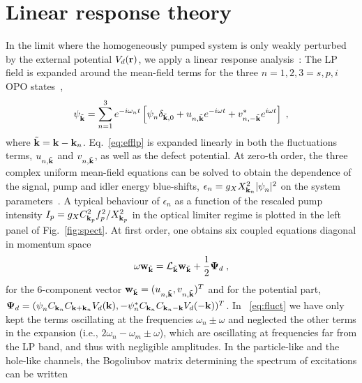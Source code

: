 \section{Linear response theory}
%
In the limit where the homogeneously pumped system is only weakly
perturbed by the external potential $V_d({\mathbf r})$, we apply a linear
response analysis~\cite{Astrakharchik_2004}: The LP field is expanded
around the mean-field terms for the three $n=1,2,3=s,p,i$ OPO
states~\cite{Whittaker_2005},
%
\begin{equation}
  \psi_{\tilde{{\mathbf k}}}^{} = \sum_{n=1}^3 e^{-i \omega_n t}
  \left[\psi_{n}^{} \delta_{\tilde{{\mathbf k}},0} +
    u_{n,\tilde{{\mathbf k}}}^{} e^{-i\omega t} +
    v^*_{n,-\tilde{{\mathbf k}}} e^{i\omega t} \right]\; ,
\label{eq:expan}
\end{equation}
%
where $\tilde{{\mathbf k}} = {\mathbf k} - {\mathbf k}_n$. Eq.~\eqref{eq:efflp}
is expanded linearly in both the fluctuations terms,
$u_{n,\tilde{{\mathbf k}}}^{}$ and $v_{n,\tilde{{\mathbf k}}}^{}$, as well
as the defect potential.  At zero-th order, the three complex uniform
mean-field equations can be solved to obtain the dependence of the
signal, pump and idler energy blue-shifts, $\epsilon_n = g_X
X^2_{{\mathbf k}_n} |\psi_{n}^{}|^2$ on the system
parameters~\cite{Wouters_2007_b,SM}. A typical behaviour of
$\epsilon_n$ as a function of the rescaled pump intensity $I_p = g_X
C_{{\mathbf k}_p}^2 f_p^2/X_{{\mathbf k}_p}^2$ in the optical limiter regime
is plotted in the left panel of Fig.~\ref{fig:spect}.
%
At first order, one obtains six coupled equations diagonal in momentum
space~\cite{Wouters_2007}
%
\begin{equation}
  \omega {\mathbf w}_{\tilde{{\mathbf k}}} = \mathcal{L}_{\tilde{{\mathbf k}}}
  {\mathbf w}_{\tilde{{\mathbf k}}} + \displaystyle\frac{1}{2} {\boldsymbol\Psi}_d\; ,
\label{eq:fluct}
\end{equation}
%
for the $6$-component vector ${\mathbf w}_{\tilde{{\mathbf k}}} =
(u_{n,\tilde{{\mathbf k}}}^{} , v_{n,\tilde{{\mathbf k}}}^{})^{T}$ and for
the potential part, ${\boldsymbol\Psi}_d = (\psi_n^{} C_{{\mathbf k}_n}
C_{{\mathbf k} + {\mathbf k}_n} V_d({\mathbf k}),-\psi_n^* C_{{\mathbf k}_n}
C_{{\mathbf k}_n - {\mathbf k}} V_d(-{\mathbf k}))^{T}$. In ~\eqref{eq:fluct}
we have only kept the terms oscillating at the frequencies $\omega_n
\pm \omega$ and neglected the other terms in the expansion (i.e.,
$2\omega_n - \omega_m \pm \omega$), which are oscillating at
frequencies far from the LP band, and thus with negligible amplitudes.
%
In the particle-like and the hole-like channels, the Bogoliubov matrix
determining the spectrum of excitations can be written
